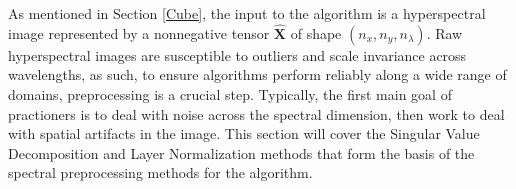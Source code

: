 As mentioned in Section \ref{Cube}, the input to the algorithm is a hyperspectral image represented by a nonnegative tensor $\hat{\mathbf{X}}$  of shape $(n_x, n_y, n_\lambda)$. Raw hyperspectral images are susceptible to outliers and scale invariance across wavelengths, as such, to ensure algorithms perform reliably along a wide range of domains, preprocessing is a crucial step. Typically, the first main goal of practioners is to deal with noise across the spectral dimension, then work to deal with spatial artifacts in the image. This section will cover the Singular Value Decomposition and Layer Normalization methods that form the basis of the spectral preprocessing methods for the algorithm.


